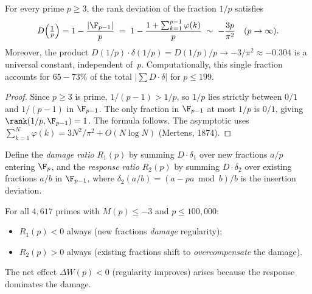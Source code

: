 

\begin{proposition}[Dominance of $1/p$]\label{prop:D1p}
For every prime $p\ge3$, the rank deviation of the fraction $1/p$ satisfies
\[
  D\!\left(\tfrac{1}{p}\right) = 1 - \frac{|{\F}_{p-1}|}{p}
  \;=\; 1 - \frac{1+\sum_{k=1}^{p-1}\varphi(k)}{p}
  \;\sim\; -\frac{3p}{\pi^2}
  \quad(p\to\infty).
\]
Moreover, the product $D(1/p)\cdot\delta(1/p) = D(1/p)/p \to -3/\pi^2\approx -0.304$
is a universal constant, independent of~$p$.  Computationally, this single fraction
accounts for $65{-}73\%$ of the total $|\sum D\cdot\delta|$ for $p\le199$.
\end{proposition}

\begin{proof}
Since $p\ge3$ is prime, $1/(p{-}1) > 1/p$, so $1/p$ lies strictly between
$0/1$ and $1/(p{-}1)$ in ${\F}_{p-1}$.  The only fraction in ${\F}_{p-1}$
at most $1/p$ is $0/1$, giving $\rank(1/p, {\F}_{p-1}) = 1$.
The formula follows.  The asymptotic uses
$\sum_{k=1}^{N}\varphi(k) = 3N^2/\pi^2 + O(N\log N)$ (Mertens, 1874).
\end{proof}


\begin{observation}\label{obs:damage-response}
Define the \emph{damage ratio} $R_1(p)$ by summing $D\cdot\delta_1$
over new fractions $a/p$ entering ${\F}_p$, and the \emph{response ratio}
$R_2(p)$ by summing $D\cdot\delta_2$ over existing fractions $a/b$ in
${\F}_{p-1}$, where $\delta_2(a/b) = (a - pa\bmod b)/b$ is the
insertion deviation.

For all $4{,}617$ primes with $M(p)\le-3$ and $p\le100{,}000$:
\begin{itemize}
\item $R_1(p) < 0$ always (new fractions \emph{damage} regularity);
\item $R_2(p) > 0$ always (existing fractions shift to
  \emph{overcompensate} the damage).
\end{itemize}
The net effect $\Delta W(p) < 0$ (regularity improves) arises because
the response dominates the damage.
\end{observation}

